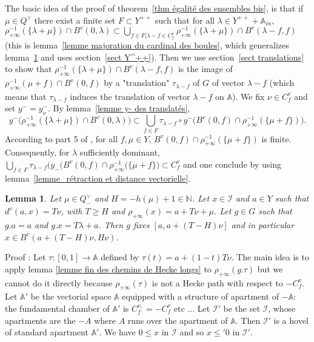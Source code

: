 \documentclass[12pt]{article}
\theoremstyle{plain}
\newtheorem{lemme}[thm]{Lemma}
\theoremstyle{definition}
\newcommand{\A}{\mathbb{A}}
\newcommand{\N}{\mathbb{N}}
\begin{document}
The basic idea of the proof of theorem~\ref{thm égalité des ensembles bis}, is that if $\mu\in Q^\vee$ there exist a finite set $F\subset Y^{++}$ such that for all $\lambda\in Y^{++}+\A_{in}$, $\rho_{+\infty}^{-1}(\{\lambda+\mu\})\cap B^v(0,\lambda) \subset \bigcup_{f\in F|\lambda-f\in\overline{C^v_f}} \rho_{+\infty}^{-1}(\{\lambda+\mu\})\cap B^v(\lambda-f,f)$ (this is lemma~\ref{lemme majoration du cardinal des boules}, which generalizes lemma~\ref{lemme distance finie à l'appartement} and uses section~\ref{sect Y^++}). Then we use section~\ref{sect translations} to show  that $\rho_{+\infty}^{-1}(\{\lambda+\mu\})\cap B^v(\lambda-f,f)$ is the image of $\rho_{+\infty}^{-1}(\mu+f)\cap B^v(0,f)$ by a "translation" $\tau_{\lambda-f}$ of $G$ of vector $\lambda-f$ (which means that $\tau_{\lambda-f}$ induces the translation of vector $\lambda-f$ on $\mathbb{A}$). We fix $\nu\in C_f^v$ and set $y^-=y_\nu^-$. By lemma~\ref{lemme y- des translatés},  \[y^-\big(\rho_{+\infty}^{-1}(\{\lambda+\mu\})\cap B^v(0,\lambda)\big)\subset\bigcup_{f\in F}\tau_{\lambda-f}\circ y^-\big(B^v(0,f)\cap \rho_{+\infty}^{-1}(\{\mu +f\})\big).\] According to part 5 of \cite{gaussent2014spherical}, for all $f, \mu \in Y$, $B^v(0,f)\cap \rho_{+\infty}^{-1}(\{\mu +f\})$ is finite. Consequently, for $\lambda$ sufficiently dominant, $\bigcup_{f\in F}\tau_{\lambda-f}\big(y_-(B^v(0,f)\cap \rho_{+\infty}^{-1}(\{\mu +f\}\big)\subset C^v_f$  and one conclude by using lemma~\ref{lemme_rétraction et distance vectorielle}. 
 



\begin{lemme}\label{lemme distance finie à l'appartement}
Let $\mu\in Q^\vee_-$ and $H=-h(\mu)+1\in \N$. Let $x\in \mathcal{I}$ and $a\in Y$ such that $d^v(a,x)=T\nu$, with $T\geq H$ and $\rho_{+\infty}(x)=a+T\nu +\mu$. Let $g\in G$ such that $g.a=a$ and $g.x=T\lambda+a$. Then $g$ fixes $[a,a+(T-H)\nu]$ and in particular $x\in B^v(a+(T-H)\nu,H\nu)$.
\end{lemme}

Proof : Let $\tau:[0,1]\rightarrow \mathbb{A}$ defined by $\tau(t)=a+(1-t)T\nu$. The main idea is to apply lemma \ref{lemme fin des chemins de Hecke longs} to $\rho_{+\infty}(g.\tau)$ but we cannot do it directly because $\rho_{+\infty}(\tau)$ is not a Hecke path with respect to $-C^v_f$. Let $\mathbb{A}'$ be the vectorial space $\mathbb{A}$ equipped with a structure of apartment of $-\mathbb{A}$: the fundamental chamber of $\mathbb{A}'$ is $C^{v,}_f=-C^v_f$ etc ... Let $\mathcal{I}'$ be the set $\mathcal{I}$, whose apartments are the $-A$ where $A$ runs over the apartment of $\mathbb{A}$. Then $\mathcal{I}'$ is a hovel of standard apartment $\mathbb{A}'$. We have $0\leq x$ in $\mathcal{I}$ and so $x\leq'0$ in $\mathcal{I}'$. 
 
\end{document}
